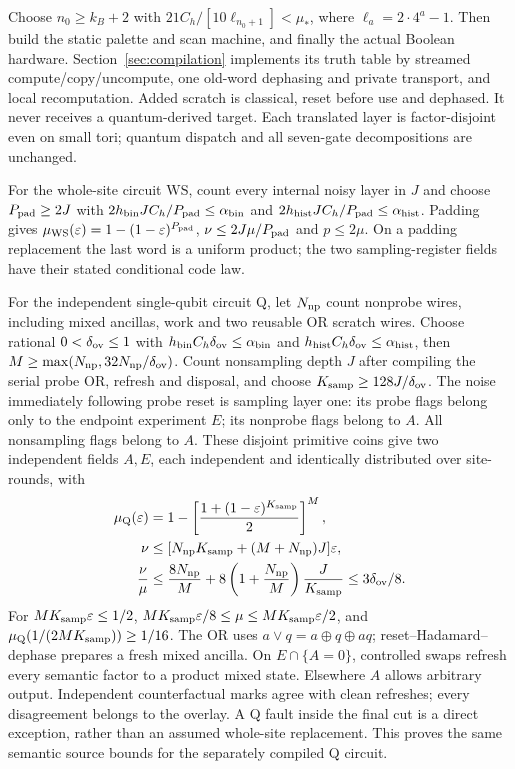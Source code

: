 Choose \(n_0\ge k_B+2\) with
\(21C_h/[10\ell_{n_0+1}]<\mu_*\), where \(\ell_a=2\cdot4^a-1\).
Then build the static palette and scan machine, and finally the actual
Boolean hardware. Section~\ref{sec:compilation} implements its truth
table by streamed compute/copy/uncompute, one old-word dephasing and
private transport, and local recomputation. Added scratch is classical,
reset before use and dephased. It never receives a quantum-derived
target. Each translated layer is factor-disjoint even on small tori;
quantum dispatch and all seven-gate decompositions are unchanged.

For the whole-site circuit \(\mathrm{WS}\), count every internal noisy layer in \(J\) and choose \(P_{\rm pad}\ge2J\)
with \(2h_{\rm bin}JC_h/P_{\rm pad}\le\alpha_{\rm bin}\) and
\(2h_{\rm hist}JC_h/P_{\rm pad}\le\alpha_{\rm hist}\). Padding gives
\mbox{\(\mu_{\mathrm{WS}}(\varepsilon)=1-(1-\varepsilon)^{P_{\rm pad}}\)},
\(\nu\le2J\mu/P_{\rm pad}\) and \(p\le2\mu\). On a padding replacement the
last word is a uniform product; the two sampling-register fields have their stated
conditional code law.

For the independent single-qubit circuit \(\mathrm Q\), let \(N_{\rm np}\) count nonprobe wires, including mixed ancillas,
work and two reusable OR scratch wires. Choose rational
\(0<\delta_{\rm ov}\le1\) with
\(h_{\rm bin}C_h\delta_{\rm ov}\le\alpha_{\rm bin}\) and
\(h_{\rm hist}C_h\delta_{\rm ov}\le\alpha_{\rm hist}\), then
\(M\ge\max(N_{\rm np},32N_{\rm np}/\delta_{\rm ov})\).
Count nonsampling depth \(J\) after compiling the serial probe OR,
refresh and disposal, and choose \(K_{\rm samp}\ge128J/\delta_{\rm ov}\).
The noise immediately following probe reset is sampling layer one:
its probe flags belong only to the endpoint experiment \(E\); its
nonprobe flags belong to \(A\). All nonsampling flags belong to \(A\).
These disjoint primitive coins give two independent fields \(A,E\), each independent and identically distributed over site-rounds, with
\begin{equation}\label{v:q-rates}
\begin{aligned}
 \mu_{\mathrm Q}(\varepsilon)&=1-\left[\frac{1+(1-\varepsilon)^{K_{\rm samp}}}{2}\right]^M,\\
 \nu&\le[N_{\rm np}K_{\rm samp}+(M+N_{\rm np})J]\varepsilon,\\
 \frac\nu\mu&\le\frac{8N_{\rm np}}M+
 8\left(1+\frac{N_{\rm np}}M\right)\frac{J}{K_{\rm samp}}
 \le3\delta_{\rm ov}/8.
\end{aligned}
\end{equation}
For \(MK_{\rm samp}\varepsilon\le1/2\),
\(MK_{\rm samp}\varepsilon/8\le\mu\le MK_{\rm samp}\varepsilon/2\), and
\(\mu_{\mathrm Q}(1/(2MK_{\rm samp}))\ge1/16\).
The OR uses \(a\lor q=a\oplus q\oplus aq\); reset--Hadamard--dephase
prepares a fresh mixed ancilla. On \(E\cap\{A=0\}\), controlled swaps
refresh every semantic factor to a product mixed state. Elsewhere
\(A\) allows arbitrary output. Independent counterfactual marks agree
with clean refreshes; every disagreement belongs to the overlay. A Q
fault inside the final cut is a direct exception, rather than an assumed
whole-site replacement. This proves the same semantic source bounds
for the separately compiled Q circuit.

